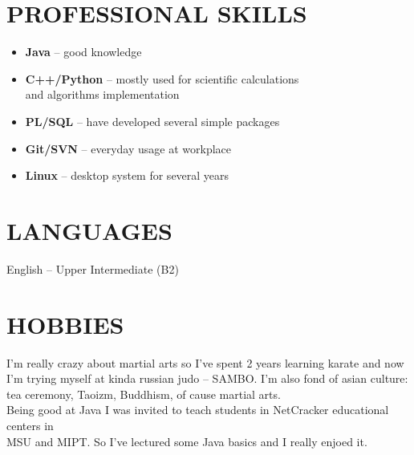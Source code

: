 \documentclass[margin,12pt]{res}
\begin{document}
\begin{resume}
\section{PROFESSIONAL SKILLS}
\begin{itemize} \itemsep -2pt
  \item \textbf{Java} -- good knowledge\\
  \item \textbf{C++/Python} -- mostly used for scientific
    calculations\\
 and algorithms implementation\\
  \item \textbf{PL/SQL} -- have developed several simple packages\\
  \item \textbf{Git/SVN} -- everyday usage at workplace\\
  \item \textbf{Linux} -- desktop system for several years\\
\end{itemize}
\section{LANGUAGES} 
English -- Upper Intermediate (B2)\\
\section{HOBBIES}
I'm really crazy about martial arts so I've spent 2 years learning
karate and now\\
 I'm trying myself at kinda russian judo -- SAMBO. I'm
also fond of asian culture:\\
tea ceremony, Taoizm, Buddhism, of cause
martial arts.\\
Being good at Java I was invited to teach students in NetCracker
educational centers in\\
 MSU and MIPT. So I've lectured some Java basics
and I really enjoed it.

\end{resume}
\end{document}
